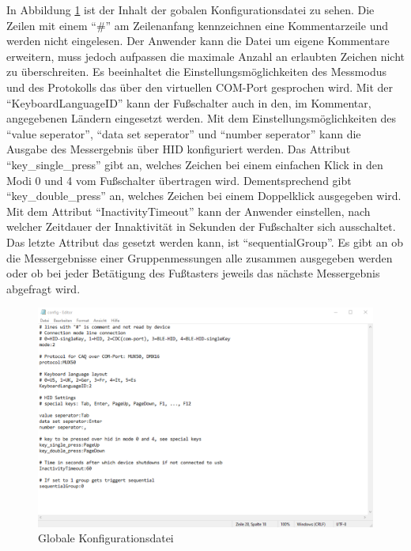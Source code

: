 In Abbildung \ref{fig:GlobaleKonfigurationsdatei} ist der Inhalt der gobalen Konfigurationsdatei zu sehen. Die Zeilen mit einem ``\#'' am Zeilenanfang kennzeichnen eine Kommentarzeile und werden nicht eingelesen. Der Anwender kann die Datei um eigene Kommentare erweitern, muss jedoch aufpassen die maximale Anzahl an erlaubten Zeichen nicht zu überschreiten. Es beeinhaltet die Einstellungsmöglichkeiten des Messmodus und des Protokolls das über den virtuellen COM-Port gesprochen wird. Mit der ``KeyboardLanguageID'' kann der Fußschalter auch in den, im Kommentar, angegebenen Ländern eingesetzt werden. Mit dem Einstellungsmöglichkeiten des ``value seperator'', ``data set seperator'' und ``number seperator'' kann die Ausgabe des Messergebnis über \ac{HID} konfiguriert werden. Das Attribut ``key\_single\_press'' gibt an, welches Zeichen bei einem einfachen Klick in den Modi 0 und 4 vom Fußschalter übertragen wird. Dementsprechend gibt ``key\_double\_press'' an, welches Zeichen bei einem Doppelklick ausgegeben wird. Mit dem Attribut ``InactivityTimeout'' kann der Anwender einstellen, nach welcher Zeitdauer der Innaktivität in Sekunden der Fußschalter sich ausschaltet. Das letzte Attribut das gesetzt werden kann, ist ``sequentialGroup''. Es gibt an ob die Messergebnisse einer Gruppenmessungen alle zusammen ausgegeben werden oder ob bei jeder Betätigung des Fußtasters jeweils das nächste Messergebnis abgefragt wird.
\begin{figure}[H] 
	\centering
	\includegraphics[width=\textwidth]{figures/configfile.png}
	\caption{Globale Konfigurationsdatei}
	\label{fig:GlobaleKonfigurationsdatei}
\end{figure}

